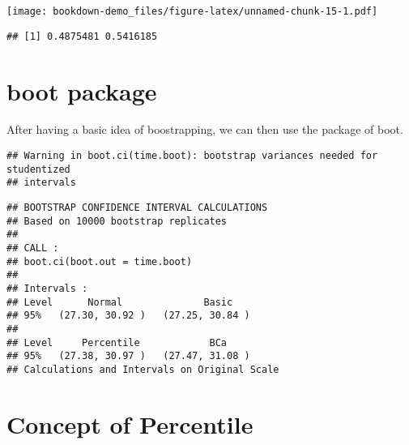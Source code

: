 \documentclass[]{book}
\newenvironment{Shaded}{\begin{snugshade}}{\end{snugshade}}
\newcommand{\ControlFlowTok}[1]{\textcolor[rgb]{0.13,0.29,0.53}{\textbf{#1}}}
\newcommand{\DecValTok}[1]{\textcolor[rgb]{0.00,0.00,0.81}{#1}}
\newcommand{\KeywordTok}[1]{\textcolor[rgb]{0.13,0.29,0.53}{\textbf{#1}}}
\newcommand{\NormalTok}[1]{#1}
\newcommand{\OperatorTok}[1]{\textcolor[rgb]{0.81,0.36,0.00}{\textbf{#1}}}
\newcommand{\StringTok}[1]{\textcolor[rgb]{0.31,0.60,0.02}{#1}}
\begin{document}
\texttt{[image: bookdown-demo\_files/figure-latex/unnamed-chunk-15-1.pdf]}

\begin{verbatim}
## [1] 0.4875481 0.5416185
\end{verbatim}

\hypertarget{boot-package}{%
\section{boot package}\label{boot-package}}

After having a basic idea of boostrapping, we can then use the package of boot.

\begin{Shaded}
\end{Shaded}

\begin{verbatim}
## Warning in boot.ci(time.boot): bootstrap variances needed for studentized
## intervals
\end{verbatim}

\begin{verbatim}
## BOOTSTRAP CONFIDENCE INTERVAL CALCULATIONS
## Based on 10000 bootstrap replicates
## 
## CALL : 
## boot.ci(boot.out = time.boot)
## 
## Intervals : 
## Level      Normal              Basic         
## 95%   (27.30, 30.92 )   (27.25, 30.84 )  
## 
## Level     Percentile            BCa          
## 95%   (27.38, 30.97 )   (27.47, 31.08 )  
## Calculations and Intervals on Original Scale
\end{verbatim}

\hypertarget{concept-of-percentile}{%
\section{Concept of Percentile}\label{concept-of-percentile}}
\end{document}
